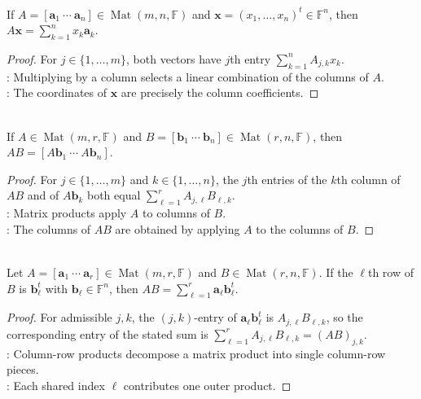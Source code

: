 \begin{proposition} \label{prop:matrix-vector-product-column-combination} \\
If $A=[\mathbf{a}_1\ \cdots\ \mathbf{a}_n]\in\operatorname{Mat}(m,n,\mathbb{F})$ and $\mathbf{x}=(x_1,\ldots,x_n)^t\in\mathbb{F}^n$, then $A\mathbf{x}=\sum\limits_{k=1}^{n}x_k\mathbf{a}_k$.
\begin{proof}
For $j\in\{1,\ldots,m\}$, both vectors have $j$th entry $\sum\limits_{k=1}^{n}A_{j,k}x_k$.\\
: Multiplying by a column selects a linear combination of the columns of $A$.\\
: The coordinates of $\mathbf{x}$ are precisely the column coefficients.
\end{proof}
\end{proposition}

\begin{proposition} \label{prop:matrix-product-by-columns} \\
If $A\in\operatorname{Mat}(m,r,\mathbb{F})$ and $B=[\mathbf{b}_1\ \cdots\ \mathbf{b}_n]\in\operatorname{Mat}(r,n,\mathbb{F})$, then $AB=[A\mathbf{b}_1\ \cdots\ A\mathbf{b}_n]$.
\begin{proof}
For $j\in\{1,\ldots,m\}$ and $k\in\{1,\ldots,n\}$, the $j$th entries of the $k$th column of $AB$ and of $A\mathbf{b}_k$ both equal $\sum\limits_{\ell=1}^{r}A_{j,\ell}B_{\ell,k}$.\\
: Matrix products apply $A$ to columns of $B$.\\
: The columns of $AB$ are obtained by applying $A$ to the columns of $B$.
\end{proof}
\end{proposition}

\begin{proposition} \label{prop:matrix-product-outer-product-decomposition} \\
Let $A=[\mathbf{a}_1\ \cdots\ \mathbf{a}_r]\in\operatorname{Mat}(m,r,\mathbb{F})$ and $B\in\operatorname{Mat}(r,n,\mathbb{F})$. If the $\ell$th row of $B$ is $\mathbf{b}_{\ell}^t$ with $\mathbf{b}_{\ell}\in\mathbb{F}^n$, then $AB=\sum\limits_{\ell=1}^{r}\mathbf{a}_{\ell}\mathbf{b}_{\ell}^t$.
\begin{proof}
For admissible $j,k$, the $(j,k)$-entry of $\mathbf{a}_{\ell}\mathbf{b}_{\ell}^t$ is $A_{j,\ell}B_{\ell,k}$, so the corresponding entry of the stated sum is $\sum\limits_{\ell=1}^{r}A_{j,\ell}B_{\ell,k}=(AB)_{j,k}$.\\
: Column-row products decompose a matrix product into single column-row pieces.\\
: Each shared index $\ell$ contributes one outer product.
\end{proof}
\end{proposition}

